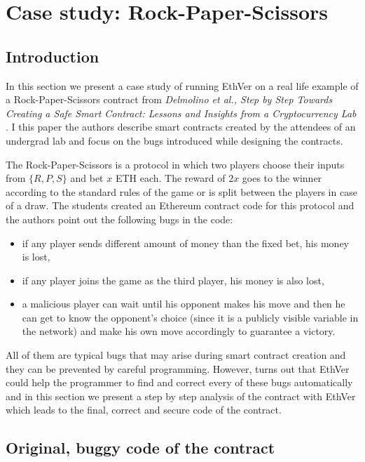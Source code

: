 
\section{Case study: Rock-Paper-Scissors}

\subsection{Introduction}

In this section we present a case study of running EthVer on a real life example of a Rock-Paper-Scissors contract 
from \emph{Delmolino et al., Step by Step Towards Creating a Safe Smart Contract: Lessons and
Insights from a Cryptocurrency Lab} \cite{delmolino}.
I this paper the authors describe smart contracts created by the attendees of an undergrad lab and focus on
the bugs introduced while designing the contracts.

The Rock-Paper-Scissors is a protocol in which two players choose their inputs from $\{R, P, S\}$ and bet
$x$ ETH each. The reward of $2x$ goes to the winner according to the standard rules of the game or is split
between the players in case of a draw.
The students created an Ethereum contract code for this protocol and the authors point out the following
bugs in the code:
\begin{itemize}
\item if any player sends different amount of money than the fixed bet, his money is lost,
\item if any player joins the game as the third player, his money is also lost,
\item a malicious player can wait until his opponent makes his move and then he can get to know the opponent's
choice (since it is a publicly visible variable in the network) and make his own move accordingly to guarantee
a victory.
\end{itemize}
All of them are typical bugs that may arise during smart contract creation and they can be prevented by careful 
programming.
However, turns out that EthVer could help the programmer
to find and correct every of these bugs automatically  and in this section we present a step by step analysis 
of the contract with EthVer which leads to the final, correct and secure code of the contract.


\subsection{Original, buggy code of the contract}

